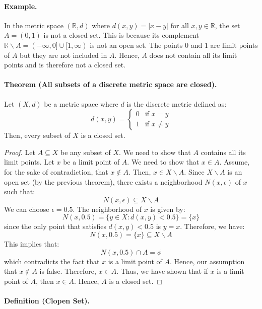 \documentclass[openany]{book}
\numberwithin{equation}{section}
\begin{document}
\paragraph{Example.}

    In the metric space $(\mathbb{R}, d)$ where $d(x, y) = |x - y|$ for all $x, y \in \mathbb{R}$, the set $A = (0, 1)$ is not a closed set. This is because its complement $\mathbb{R} \backslash A = (-\infty, 0] \cup [1, \infty)$ is not an open set. The points $0$ and $1$ are limit points of $A$ but they are not included in $A$. Hence, $A$ does not contain all its limit points and is therefore not a closed set.
\par
\paragraph{Theorem (All subsets of a discrete metric space are closed).}

    Let $(X, d)$ be a metric space where $d$ is the discrete metric defined as:
    $$d(x, y) = 
    \begin{cases}
        0 & \text{if } x = y \\
        1 & \text{if } x \neq y
    \end{cases}$$
    Then, every subset of $X$ is a closed set.
\par
\begin{proof}
    Let $A \subseteq X$ be any subset of $X$. We need to show that $A$ contains all its limit points. Let $x$ be a limit point of $A$. We need to show that $x \in A$. Assume, for the sake of contradiction, that $x \notin A$. Then, $x \in X \backslash A$. Since $X \backslash A$ is an open set (by the previous theorem), there exists a neighborhood $N(x, \epsilon)$ of $x$ such that:
    $$N(x, \epsilon) \subseteq X \backslash A$$
    We can choose $\epsilon = 0.5$. The neighborhood of $x$ is given by:
    $$N(x, 0.5) = \{y \in X: d(x, y) < 0.5\} = \{x\}$$
    since the only point that satisfies $d(x, y) < 0.5$ is $y = x$. Therefore, we have:
    $$N(x, 0.5) = \{x\} \subseteq X \backslash A$$
    This implies that:
    $$N(x, 0.5) \cap A = \phi$$
    which contradicts the fact that $x$ is a limit point of $A$. Hence, our assumption that $x \notin A$ is false. Therefore, $x \in A$. Thus, we have shown that if $x$ is a limit point of $A$, then $x \in A$. Hence, $A$ is a closed set.
\end{proof}
\paragraph{Definition (Clopen Set).}
\end{document}
